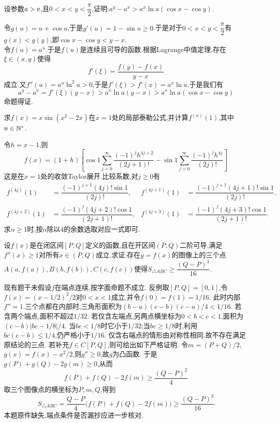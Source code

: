 \documentclass{ctexart}
\begin{document}
\begin{problem}[6.(10\songti{分})]
设参数$a>\mathrm{e}$,且$0<x<y<\dfrac\pi2$,证明:$a^y-a^x>a^x\ln a(\cos x-\cos y)$.
\end{problem}
\begin{solution}
令$g(u)=u+\cos u$,于是$g'(u)=1-\sin u\geqslant0$.于是对于$0<x<y<\dfrac\pi2$有$g(x)<g(y)$,即$\cos x-\cos y<y-x$.\\
    令$f(u)=a^u$.于是$f(u)$是连续且可导的函数.根据Lagrange中值定理,存在$\xi\in(x,y)$使得
    \[f'(\xi)=\dfrac{f(y)-f(x)}{y-x}\]
    成立.又$f''(u)=a^u\ln^2a>0$,于是$f'(\xi)>f'(x)=a^x\ln a$.于是我们有
    \[a^y-a^x=f'(\xi)(y-x)>a^x\ln a(y-x)>a^x\ln a(\cos x-\cos y)\]
    命题得证.
\end{solution}
\begin{problem}[7.(12\songti{分})]
求$f(x)=x\sin(x^2-2x)$在$x=1$处的局部泰勒公式,并计算$f^{(n)}(1)$,其中$n\in\mathbb{N}^*$.
\end{problem}
\begin{solution}
令$h=x-1$,则
\[f(x)=(1+h)\left[\cos1\sum_{j=0}^{\infty}\dfrac{(-1)^jh^{4j+2}}{(2j+1)!}
-\sin1\sum_{j=0}^{\infty}\dfrac{(-1)^jh^{4j}}{(2j)!}\right]\]
这是在$x=1$处的收敛Taylor展开.比较系数,对$j\geqslant0$有
\[\begin{aligned}
f^{(4j)}(1)&=\dfrac{(-1)^{j+1}(4j)!\sin1}{(2j)!},&
f^{(4j+1)}(1)&=\dfrac{(-1)^{j+1}(4j+1)!\sin1}{(2j)!},\\
f^{(4j+2)}(1)&=\dfrac{(-1)^j(4j+2)!\cos1}{(2j+1)!},&
f^{(4j+3)}(1)&=\dfrac{(-1)^j(4j+3)!\cos1}{(2j+1)!}.
\end{aligned}\]
求$n\geqslant1$时,按$n$除以$4$的余数选取对应一式即可.
\end{solution}
\begin{problem}[8.(10\songti{分})]
设$f(x)$是在闭区间$[P,Q]$定义的函数,且在开区间$(P,Q)$二阶可导,满足$f''(x)\geqslant1$对所有$x\in(P,Q)$成立.求证:存在$y=f(x)$的图像上的三个点%
    $A(a,f(a)),B(b,f(b)),C(c,f(c))$使得$S_{\triangle ABC}\geqslant\dfrac{(Q-P)^3}{16}$.
\end{problem}
\begin{solution}
现有题干未假设$f$在端点连续,按字面命题不成立.
反例取$[P,Q]=[0,1]$,令$f(x)=(x-1/2)^2/2$对$0<x<1$成立,并令$f(0)=f(1)=1/16$.
此时内部$f''=1$.三个点都在内部时,三角形面积为$(b-a)(c-b)(c-a)/4<1/16$.
若含两个端点,面积不超过$1/32$.
若仅含左端点,另两点横坐标为$0<b<c<1$,面积为$(c-b)|bc-1/8|/4$.
当$bc<1/8$时它小于$1/32$;当$bc\geqslant1/8$时,利用$bc(c-b)\leqslant1/4$,仍严格小于$1/16$.
仅含右端点的情形由对称性相同.故不存在满足原结论的三点.
若补充$f\in C[P,Q]$,则可给出如下严格证明.
令$m=(P+Q)/2$, $g(x)=f(x)-x^2/2$,则$g''\geqslant0$,故$g$为凸函数.
于是$g(P)+g(Q)-2g(m)\geqslant0$,从而
\[f(P)+f(Q)-2f(m)\geqslant\dfrac{(Q-P)^2}{4}\]
取三个图像点的横坐标为$P,m,Q$,得到
\[S_{\triangle ABC}=\dfrac{Q-P}{4}\bigl(f(P)+f(Q)-2f(m)\bigr)
\geqslant\dfrac{(Q-P)^3}{16}\]
本题原件缺失,端点条件是否漏抄应进一步核对.
\end{solution}
\end{document}
